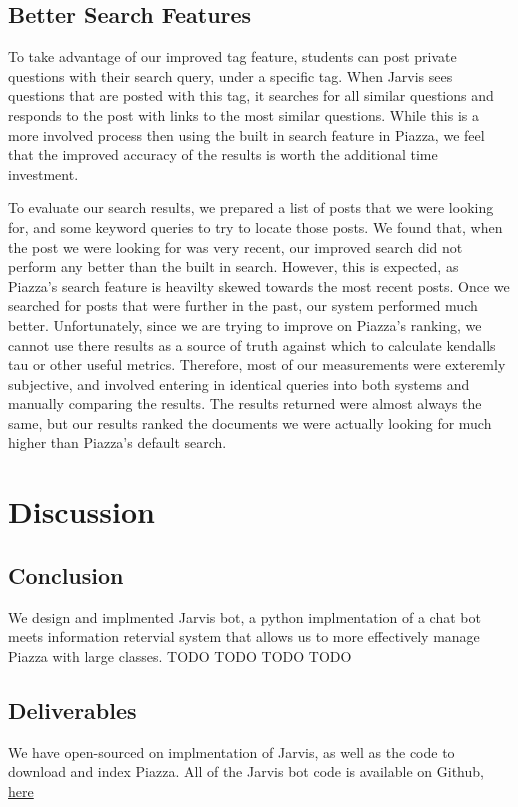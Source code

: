 \documentclass[sigconf]{acmart}
\begin{document}
\subsection{Better Search Features}
To take advantage of our improved tag feature, students can post private questions with their search query, under a specific tag. When Jarvis sees questions that are posted with this tag, it searches for all similar questions and responds to the post with links to the most similar questions. While this is a more involved process then using the built in search feature in Piazza, we feel that the improved accuracy of the results is worth the additional time investment.

To evaluate our search results, we prepared a list of posts that we were looking for, and some keyword queries to try to locate those posts. We found that, when the post we were looking for was very recent, our improved search did not perform any better than the built in search. However, this is expected, as Piazza's search feature is heavilty skewed towards the most recent posts. Once we searched for posts that were further in the past, our system performed much better. Unfortunately, since we are trying to improve on Piazza's ranking, we cannot use there results as a source of truth against which to calculate kendalls tau or other useful metrics. Therefore, most of our measurements were exteremly subjective, and involved entering in identical queries into both systems and manually comparing the results. The results returned were almost always the same, but our results ranked the documents we were actually looking for much higher than Piazza's default search.

\section{Discussion}

\subsection{Conclusion}
We design and implmented Jarvis bot, a python implmentation of a chat bot meets information retervial system that allows us to more effectively manage Piazza with large classes.
TODO TODO TODO TODO

\subsection{Deliverables}
We have open-sourced on implmentation of Jarvis, as well as the code to download and index Piazza. All of the Jarvis bot code is available on Github, \href{https://github.com/pranavr93/piazza_bot}{here}
\end{document}
